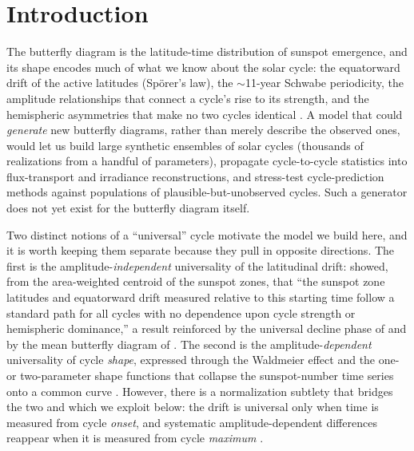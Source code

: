 \documentclass[twocolumn]{aastex631}
\begin{document}
\section{Introduction}
\label{sec:intro}

The butterfly diagram is the latitude-time distribution of sunspot emergence,
and its shape encodes much of what we know about the solar cycle: the
equatorward drift of the active latitudes (Sp\"orer's law), the $\sim$11-year
Schwabe periodicity, the amplitude relationships that connect a cycle's rise to
its strength, and the hemispheric asymmetries that make no two cycles identical
\citep[CIT]{}. A model that could \emph{generate} new butterfly diagrams, rather
than merely describe the observed ones, would let us build large synthetic
ensembles of solar cycles (thousands of realizations from a handful of
parameters), propagate cycle-to-cycle statistics into flux-transport and
irradiance reconstructions, and stress-test cycle-prediction methods against
populations of plausible-but-unobserved cycles. Such a
generator does not yet exist for the butterfly diagram itself.

Two distinct notions of a ``universal'' cycle motivate the model we build here,
and it is worth keeping them separate because they pull in opposite directions.
The first is the amplitude-\emph{independent} universality of the latitudinal
drift: \citet[CIT]{Hathaway2011} showed, from the area-weighted centroid of the
sunspot zones, that ``the sunspot zone latitudes and equatorward drift measured
relative to this starting time follow a standard path for all cycles with no
dependence upon cycle strength or hemispheric dominance,'' a result reinforced
by the universal decline phase of \citet[CIT]{CameronSchussler2016} and by the
mean butterfly diagram of \citet[CIT]{CameronSchussler2024}. The second is the
amplitude-\emph{dependent} universality of cycle \emph{shape}, expressed through
the Waldmeier effect and the one- or two-parameter shape functions that collapse
the sunspot-number time series onto a common curve
\citep[CIT]{HathawayWilsonReichmann1994, Volobuev2009}. However, there is a
normalization subtlety that bridges the two and which we exploit below: the
drift is universal only when time is measured from cycle \emph{onset}, and
systematic amplitude-dependent differences reappear when it is measured from
cycle \emph{maximum} \citep[CIT]{Hathaway2011}.
\end{document}
